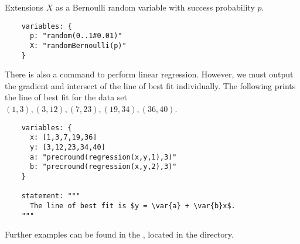 \begin{chapter}{\label{cha:extensions}Extensions}
  $X$ as a Bernoulli random variable with success probability $p$.
  \begin{Verbatim}
    variables: {
      p: "random(0..1#0.01)"
      X: "randomBernoulli(p)"
    }
  \end{Verbatim}
  There is also a command to perform linear regression. However, we must output
  the gradient and intersect of the line of best fit individually.  The
  following prints the line of best fit for the data set $(1,3), (3,12),
  (7,23), (19,34), (36,40)$.
  \begin{Verbatim}
    variables: {
      x: [1,3,7,19,36]
      y: [3,12,23,34,40]
      a: "precround(regression(x,y,1),3)"
      b: "precround(regression(x,y,2),3)"
    }
    
    statement: """
      The line of best fit is $y = \var{a} + \var{b}x$.
    """  
	\end{Verbatim}
  Further examples can be found in the , located
  in the  directory.
		
\end{chapter}
